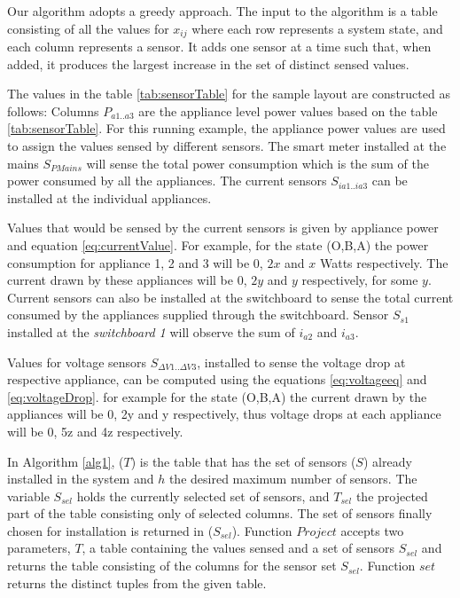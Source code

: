 Our algorithm adopts a greedy approach. %
The input to the algorithm is a table consisting of all the values for $x_{ij}$
where each row represents a system state, and each column represents a sensor.
It adds one sensor at a time such that, when added, it produces the largest increase in the set of distinct sensed values.

The values in the table \ref{tab:sensorTable} for the sample layout are constructed as follows:
Columns ${P_{a1..a3}}$ are the appliance level power values based on the table \ref{tab:sensorTable}. For this running example, the appliance power values are used to assign the values sensed by different sensors. The smart meter installed at the mains $S_{PMains}$ will sense the total power consumption which is the sum of the power consumed by all the appliances. The current sensors $S_{ia1..ia3}$ can be installed at the individual appliances.

Values that would be sensed by the current sensors is given by appliance power and equation \ref{eq:currentValue}. For example, for the state (O,B,A) the power consumption for appliance 1, 2 and 3 will be $0$, $2x$ and $x$ Watts respectively.
The current drawn by these appliances will be $0$, $2y$ and $y$ respectively, for some $y$.
Current sensors can also be installed at the switchboard to sense the total current consumed by the appliances supplied through the switchboard. Sensor $S_{s1}$ installed at the \textit{switchboard 1} will observe the sum of $i_{a2}$ and $i_{a3}$.

Values for voltage sensors $S_{\Delta V1..\Delta V3}$, installed to sense the voltage drop at respective appliance, can be computed using the equations \ref{eq:voltageeq} and \ref{eq:voltageDrop}.
for example for the state (O,B,A) the current drawn by the appliances will be 0, 2y and y respectively, thus voltage drops at each appliance will be 0, 5z and 4z respectively.


In Algorithm \ref{alg1}, ($T$) is the table that has the set of sensors ($S$) already installed in the system and $h$ the desired maximum number of sensors.
The variable $S_{sel}$ holds the currently selected set of sensors, and $T_{sel}$ the projected part of the table consisting only of selected columns. The set of sensors finally chosen for installation is returned in ($S_{sel}$).  Function $Project$  accepts two parameters, $T$, a table containing the values sensed and a set of sensors $S_{sel}$ and returns the table consisting of the columns for the sensor set $S_{sel}$.
Function $set$  returns the distinct tuples from the given table.

